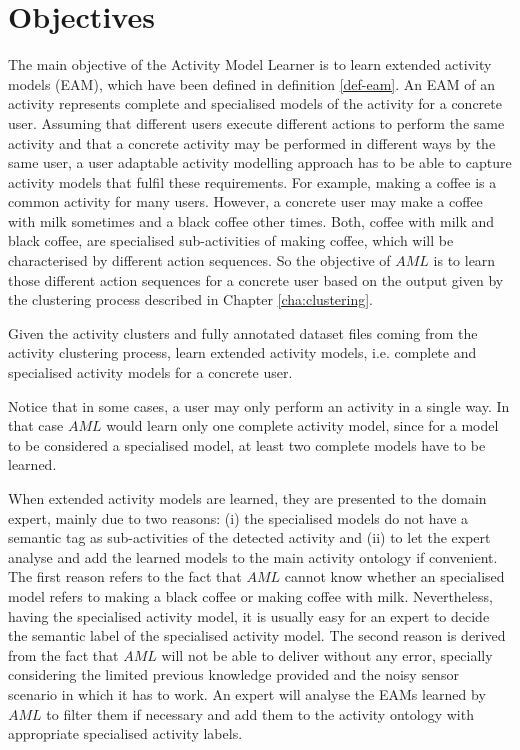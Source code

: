 \section{Objectives}
\label{sec:learner:objectives}

The main objective of the Activity Model Learner is to learn extended activity models (EAM), which have been defined in definition \ref{def-eam}. An EAM of an activity represents complete and specialised models of the activity for a concrete user. Assuming that different users execute different actions to perform the same activity and that a concrete activity may be performed in different ways by the same user, a user adaptable activity modelling approach has to be able to capture activity models that fulfil these requirements. For example, making a coffee is a common activity for many users. However, a concrete user may make a coffee with milk sometimes and a black coffee other times. Both, coffee with milk and black coffee, are specialised sub-activities of making coffee, which will be characterised by different action sequences. So the objective of $AML$ is to learn those different action sequences for a concrete user based on the output given by the clustering process described in Chapter \ref{cha:clustering}.

\begin{problem}[$AML$]
\label{pro-aml}
 Given the activity clusters and fully annotated dataset files coming from the activity clustering process, learn extended activity models, i.e. complete and specialised activity models for a concrete user.
\end{problem}

Notice that in some cases, a user may only perform an activity in a single way. In that case $AML$ would learn only one complete activity model, since for a model to be considered a specialised model, at least two complete models have to be learned. 

When extended activity models are learned, they are presented to the domain expert, mainly due to two reasons: (i) the specialised models do not have a semantic tag as sub-activities of the detected activity and (ii) to let the expert analyse and add the learned models to the main activity ontology if convenient. The first reason refers to the fact that $AML$ cannot know whether an specialised model refers to making a black coffee or making coffee with milk. Nevertheless, having the specialised activity model, it is usually easy for an expert to decide the semantic label of the specialised activity model. The second reason is derived from the fact that $AML$ will not be able to deliver without any error, specially considering the limited previous knowledge provided and the noisy sensor scenario in which it has to work. An expert will analyse the EAMs learned by $AML$ to filter them if necessary and add them to the activity ontology with appropriate specialised activity labels.


